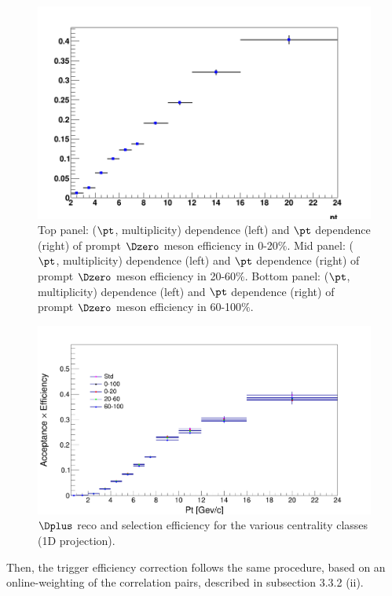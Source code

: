 \begin{figure}[h]
\includegraphics[width=.48\linewidth]{figuresVsCent/Dzero/EffAndFeed/EfficiencyMap_1D_Dzero_c_RefPtBins_Cuts020_MultWeig_wLimAcc_Plot.png}
	\caption{Top panel: ($\pt$, multiplicity) dependence (left) and $\pt$ dependence (right) of prompt $\Dzero$ meson efficiency in 0-20$\%$.
Mid panel: ($\pt$, multiplicity) dependence (left) and $\pt$ dependence (right) of prompt $\Dzero$ meson efficiency in 20-60$\%$.
Bottom panel: ($\pt$, multiplicity) dependence (left) and $\pt$ dependence (right) of prompt $\Dzero$ meson efficiency in 60-100$\%$.}
	\label{fig:dzeroEff}	
\end{figure}

\begin{figure}[h]   %
	\centering
	\includegraphics[width=.9\linewidth]{Centrality_DPlus/Dplus/Eff_cmp/eff_c_d_cmpwithjune17.png}
	\caption{$\Dplus$ reco and selection efficiency for the various centrality classes (1D projection).}
	\label{fig:dplusEff}	
\end{figure}

Then, the trigger efficiency correction follows the same procedure, based on an online-weighting of the correlation pairs, described in subsection 3.3.2 (ii).

